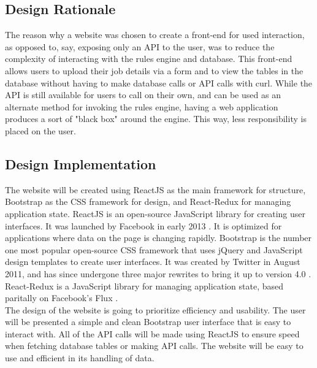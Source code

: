 \documentclass[draftclsnofoot,onecolumn,10pt,compsoc]{IEEEtran}
\begin{document}
\subsection{Design Rationale}
The reason why a website was chosen to create a front-end for used interaction, as opposed to, say, exposing only an API to the user, was to reduce the complexity of interacting with the rules engine and database. This front-end allows users to upload their job details via a form and to view the tables in the database without having to make database calls or API calls with curl. While the API is still available for users to call on their own, and can be used as an alternate method for invoking the rules engine, having a web application produces a sort of "black box" around the engine. This way, less responsibility is placed on the user.

\subsection{Design Implementation}
The website will be created using ReactJS as the main framework for structure, Bootstrap as the CSS framework for design, and React-Redux for managing application state. ReactJS is an open-source JavaScript library for creating user interfaces. It was launched by Facebook in early 2013 \cite{react-timeline}. It is optimized for applications where data on the page is changing rapidly. Bootstrap is the number one most popular open-source CSS framework that uses jQuery and JavaScript design templates to create user interfaces. It was created by Twitter in August 2011, and has since undergone three major rewrites to bring it up to version 4.0 \cite{Bootstrap}. React-Redux is a JavaScript library for managing application state, based paritally on Facebook's Flux \cite{Redux}.\\[10pt]
The design of the website is going to prioritize efficiency and usability. The user will be presented a simple and clean Bootstrap user interface that is easy to interact with. All of the API calls will be made using ReactJS to ensure speed when fetching database tables or making API calls. The website will be easy to use and efficient in its handling of data.


\bigskip
\end{document}
